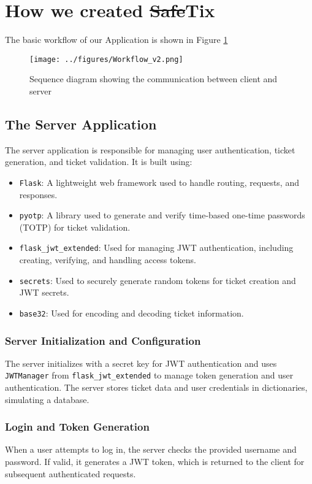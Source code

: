 \section{How we created \sout{Safe}Tix}
The basic workflow of our Application is shown in Figure \ref{fig:WorkFlow2}
\begin{figure}[H]
    \centering
    \texttt{[image: ../figures/Workflow\_v2.png]}
    \caption{Sequence diagram showing the communication between client and server}
    \label{fig:WorkFlow2}
\end{figure}
\subsection{The Server Application}

The server application is responsible for managing user authentication, ticket generation, and ticket validation. It is built using:
\begin{itemize}
    \item \texttt{Flask}: A lightweight web framework used to handle routing, requests, and responses.
    \item \texttt{pyotp}: A library used to generate and verify time-based one-time passwords (TOTP) for ticket validation.
    \item \texttt{flask\_jwt\_extended}: Used for managing JWT authentication, including creating, verifying, and handling access tokens.
    \item \texttt{secrets}: Used to securely generate random tokens for ticket creation and JWT secrets.
    \item \texttt{base32}: Used for encoding and decoding ticket information.
\end{itemize}

\subsubsection{Server Initialization and Configuration}
The server initializes with a secret key for JWT authentication and uses \texttt{JWTManager} from \texttt{flask\_jwt\_extended} to manage token generation and user authentication. The server stores ticket data and user credentials in dictionaries, simulating a database.

\subsubsection{Login and Token Generation}
When a user attempts to log in, the server checks the provided username and password. If valid, it generates a JWT token, which is returned to the client for subsequent authenticated requests.


